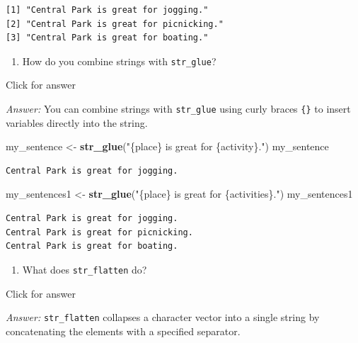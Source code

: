 \documentclass[
]{book}
\newenvironment{Shaded}{\begin{snugshade}}{\end{snugshade}}
\newcommand{\FunctionTok}[1]{\textcolor[rgb]{0.13,0.29,0.53}{\textbf{#1}}}
\newcommand{\NormalTok}[1]{#1}
\newcommand{\OtherTok}[1]{\textcolor[rgb]{0.56,0.35,0.01}{#1}}
\newcommand{\StringTok}[1]{\textcolor[rgb]{0.31,0.60,0.02}{#1}}
\providecommand{\tightlist}{%
  \setlength{\itemsep}{0pt}\setlength{\parskip}{0pt}}
\begin{document}
\begin{verbatim}
[1] "Central Park is great for jogging."   
[2] "Central Park is great for picnicking."
[3] "Central Park is great for boating."   
\end{verbatim}

\begin{enumerate}
\def\labelenumi{\alph{enumi}.}
\setcounter{enumi}{1}
\tightlist
\item
  How do you combine strings with \texttt{str\_glue}?
\end{enumerate}

Click for answer

\emph{Answer:} You can combine strings with \texttt{str\_glue} using curly braces \texttt{\{\}} to insert variables directly into the string.

\begin{Shaded}
\begin{Highlighting}[]
\NormalTok{my\_sentence }\OtherTok{\textless{}{-}} \FunctionTok{str\_glue}\NormalTok{(}\StringTok{"\{place\} is great for \{activity\}."}\NormalTok{)}
\NormalTok{my\_sentence}
\end{Highlighting}
\end{Shaded}

\begin{verbatim}
Central Park is great for jogging.
\end{verbatim}

\begin{Shaded}
\begin{Highlighting}[]
\NormalTok{my\_sentences1 }\OtherTok{\textless{}{-}} \FunctionTok{str\_glue}\NormalTok{(}\StringTok{"\{place\} is great for \{activities\}."}\NormalTok{)}
\NormalTok{my\_sentences1}
\end{Highlighting}
\end{Shaded}

\begin{verbatim}
Central Park is great for jogging.
Central Park is great for picnicking.
Central Park is great for boating.
\end{verbatim}

\begin{enumerate}
\def\labelenumi{\alph{enumi}.}
\setcounter{enumi}{2}
\tightlist
\item
  What does \texttt{str\_flatten} do?
\end{enumerate}

Click for answer

\emph{Answer:} \texttt{str\_flatten} collapses a character vector into a single string by concatenating the elements with a specified separator.
\end{document}
